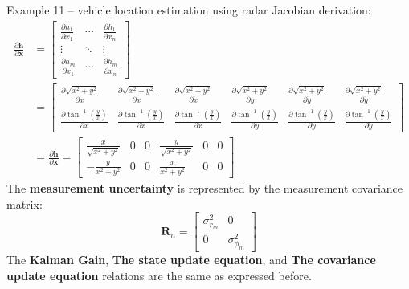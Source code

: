 \begin{frame}{Example 11 – vehicle location estimation using radar}
Jacobian derivation:
\begin{align*}
\frac{\partial \mathbf{h}}{\partial \mathbf{x}} & =
\begin{bmatrix}
\frac{\partial h_1}{\partial x_1} & \cdots & \frac{\partial h_1}{\partial x_n} \\
\vdots & \ddots & \vdots \\
\frac{\partial h_m}{\partial x_1} & \cdots & \frac{\partial h_m}{\partial x_n}
\end{bmatrix}\\
& =
\begin{bmatrix}
\frac{\partial \sqrt{x^2 + y^2}}{\partial x} & \frac{\partial \sqrt{x^2 + y^2}}{\partial \dot{x}} & \frac{\partial \sqrt{x^2 + y^2}}{\partial \ddot{x}} & \frac{\partial \sqrt{x^2 + y^2}}{\partial y} & \frac{\partial \sqrt{x^2 + y^2}}{\partial \dot{y}} & \frac{\partial \sqrt{x^2 + y^2}}{\partial \ddot{y}} \\
\frac{\partial \tan^{-1} \left( \frac{y}{x} \right)}{\partial x} & \frac{\partial \tan^{-1} \left( \frac{y}{x} \right)}{\partial \dot{x}} & \frac{\partial \tan^{-1} \left( \frac{y}{x} \right)}{\partial \ddot{x}} & \frac{\partial \tan^{-1} \left( \frac{y}{x} \right)}{\partial y} & \frac{\partial \tan^{-1} \left( \frac{y}{x} \right)}{\partial \dot{y}} & \frac{\partial \tan^{-1} \left( \frac{y}{x} \right)}{\partial \ddot{y}}
\end{bmatrix}\\
& = 
\frac{\partial \mathbf{h}}{\partial \mathbf{x}} =
\begin{bmatrix}
\frac{x}{\sqrt{x^2 + y^2}} & 0 & 0 & \frac{y}{\sqrt{x^2 + y^2}} & 0 & 0 \\
-\frac{y}{x^2 + y^2} & 0 & 0 & \frac{x}{x^2 + y^2} & 0 & 0
\end{bmatrix}
\end{align*}
The \textbf{measurement uncertainty} is represented by the measurement covariance matrix:
\[
\mathbf{R}_n =
\begin{bmatrix}
\sigma^2_{r_m} & 0 \\
0 & \sigma^2_{\phi_m}
\end{bmatrix}
\]
The \textbf{Kalman Gain}, \textbf{The state update equation}, and \textbf{The covariance update equation} relations are the same as expressed before.
\end{frame}


